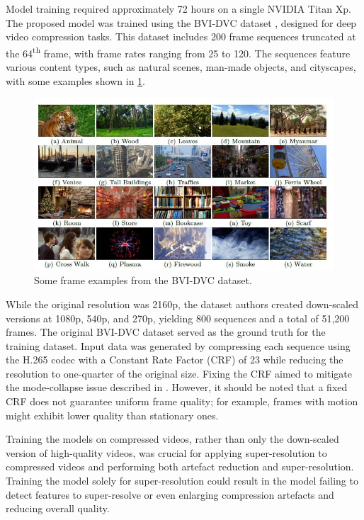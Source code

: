 Model training required approximately 72 hours on a single NVIDIA Titan Xp. The proposed model was trained using the BVI-DVC dataset \cite{ma2021bvi}, designed for deep video compression tasks. This dataset includes 200 frame sequences truncated at the 64\textsuperscript{th} frame, with frame rates ranging from 25 to 120. The sequences feature various content types, such as natural scenes, man-made objects, and cityscapes, with some examples shown in \cref{fig:bvi-dvc}.

\begin{figure}[ht]
\centering
\includegraphics[width=1.0\textwidth]{static/BVI-DVC.jpg}
\caption{Some frame examples from the BVI-DVC dataset.}
\label{fig:bvi-dvc}
\end{figure}

While the original resolution was 2160p, the dataset authors created down-scaled versions at 1080p, 540p, and 270p, yielding 800 sequences and a total of 51,200 frames. The original BVI-DVC dataset served as the ground truth for the training dataset. Input data was generated by compressing each sequence using the H.265 codec with a Constant Rate Factor (CRF) of 23 while reducing the resolution to one-quarter of the original size. Fixing the CRF aimed to mitigate the mode-collapse issue described in \cite{galteri2019deep}. However, it should be noted that a fixed CRF does not guarantee uniform frame quality; for example, frames with motion might exhibit lower quality than stationary ones.

Training the models on compressed videos, rather than only the down-scaled version of high-quality videos, was crucial for applying super-resolution to compressed videos and performing both artefact reduction and super-resolution. Training the model solely for super-resolution could result in the model failing to detect features to super-resolve or even enlarging compression artefacts and reducing overall quality.
